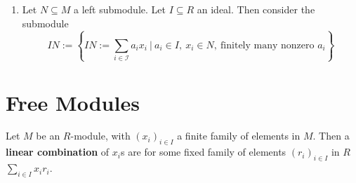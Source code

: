 \documentclass{article}
\begin{document}
\begin{enumerate}
         \begin{proof}
            Consider two functions $f: M_1 \to (M_1 + M_2)/M_2$ and $g: M_1 \to M_1\cap M_2$. Attempt to show this via applying the first isomorphism theorem. Consider the following diagram:
            \begin{figure}
                \centering
            \end{figure}

            In order to apply the first isomorphism theorem, it suffices to show that $M_1 \cap M_2 = \ker f$: as then the universal property grants the existence of such $h$, which allows the application of the First Isomorphism Theorem. This is indeed the case, as
            \begin{itemize}
                \item $M_1 \cap M_2 \subseteq \ker f$, as $M_1 \cap M_2 \subseteq M_2$ which is mapped to 0 by $f$.
                \item $M_1 \cap M_2 \supseteq \ker f$. For all $x\in \ker f$, by hypothesis $x\in M_1$; and the only elements that are annihilated by the quotient are those in $M_2$.
            \end{itemize}
        \end{proof}
    \item Let $N\subseteq M$ a left submodule. Let $I\subseteq R$ an ideal. Then consider the submodule
         \[
             IN := \left\{ IN := \sum\limits_{i\in\mathcal{I}} a_i x_i\ \Big|\ a_i \in I,\ x_i\in N,\ \text{finitely many nonzero } a_i \right\}
         \]
\end{enumerate}

\section{Free Modules}

\begin{definition}
    Let $M$ be an $R$-module, with $(x_i)_{i\in I}$ a finite family of elements in $M$. Then a \textbf{linear combination} of $x_i$s are for some fixed family of elements $(r_i)_{i\in I}$ in $R$ $\sum\limits_{i\in I} x_i r_i$.
\end{definition}
\end{document}
